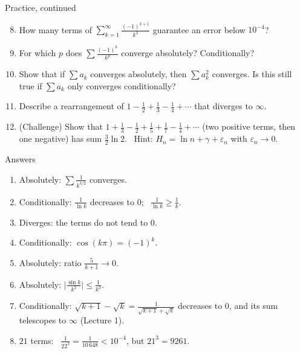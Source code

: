 \documentclass[10pt]{wosm-slides}
\begin{document}
\begin{frame}{Practice, continued}
  \small
  \begin{enumerate}
    \setcounter{enumi}{7}
    \item How many terms of $\sum_{k=1}^\infty \frac{(-1)^{k+1}}{k^3}$ guarantee an error
      below $10^{-4}$?
    \item For which $p$ does $\sum \frac{(-1)^k}{k^p}$ converge absolutely? Conditionally?
    \item Show that if $\sum a_k$ converges absolutely, then $\sum a_k^2$ converges.
      Is this still true if $\sum a_k$ only converges conditionally?
    \item Describe a rearrangement of $1 - \frac12 + \frac13 - \frac14 + \cdots$ that
      diverges to $\infty$.
    \item (Challenge) Show that $1 + \frac13 - \frac12 + \frac15 + \frac17 - \frac14 + \cdots$
      (two positive terms, then one negative) has sum $\frac32 \ln 2$. \
      Hint: $H_n = \ln n + \gamma + \varepsilon_n$ with $\varepsilon_n \to 0$.
  \end{enumerate}
\end{frame}

\begin{frame}{Answers}
  \small
  \begin{enumerate}
    \item Absolutely: $\sum \frac{1}{k^{3/2}}$ converges.
    \item Conditionally: $\frac{1}{\ln k}$ decreases to $0$; \ $\frac{1}{\ln k} \ge \frac1k$.
    \item Diverges: the terms do not tend to $0$.
    \item Conditionally: $\cos(k\pi) = (-1)^k$.
    \item Absolutely: ratio $\frac{5}{k+1} \to 0$.
    \item Absolutely: $\bigl|\frac{\sin k}{k^3}\bigr| \le \frac{1}{k^3}$.
    \item Conditionally: $\sqrt{k+1} - \sqrt{k} = \frac{1}{\sqrt{k+1} + \sqrt{k}}$ decreases
      to $0$, and its sum telescopes to $\infty$ (Lecture 1).
    \item $21$ terms: \ $\frac{1}{22^3} = \frac{1}{10\,648} < 10^{-4}$, but $21^3 = 9261$.
  \end{enumerate}
\end{frame}
\end{document}
